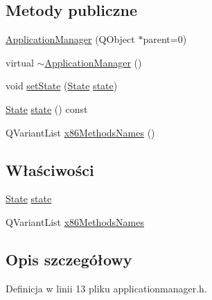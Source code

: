 \subsection*{Metody publiczne}
\begin{DoxyCompactItemize}
\item 
\hyperlink{class_application_manager_a879feb4ed324b2f0c381e2cf377fe56d}{Application\-Manager} (Q\-Object $\ast$parent=0)
\item 
virtual \hyperlink{class_application_manager_a05a04d6e3834adf031606133bbee313d}{$\sim$\-Application\-Manager} ()
\item 
void \hyperlink{class_application_manager_a9923f3e608544e9e74d604a6018c9ae1}{set\-State} (\hyperlink{class_application_manager_aeb5af7a2aa47623af5160ea1f20d0243}{State} \hyperlink{class_application_manager_a930a84127f404aa07e142c5b37dfe128}{state})
\item 
\hyperlink{class_application_manager_aeb5af7a2aa47623af5160ea1f20d0243}{State} \hyperlink{class_application_manager_aa86515d8c95bae5d713033e75becdf3c}{state} () const 
\item 
Q\-Variant\-List \hyperlink{class_application_manager_a793af100a8c392337bb94fc1f81c4d9a}{x86\-Methods\-Names} ()
\end{DoxyCompactItemize}
\subsection*{Właściwości}
\begin{DoxyCompactItemize}
\item 
\hyperlink{class_application_manager_aeb5af7a2aa47623af5160ea1f20d0243}{State} \hyperlink{class_application_manager_a930a84127f404aa07e142c5b37dfe128}{state}
\item 
Q\-Variant\-List \hyperlink{class_application_manager_a04d639af3af2e31840e42bfe72f99a0c}{x86\-Methods\-Names}
\end{DoxyCompactItemize}


\subsection{Opis szczegółowy}


Definicja w linii 13 pliku applicationmanager.\-h.



